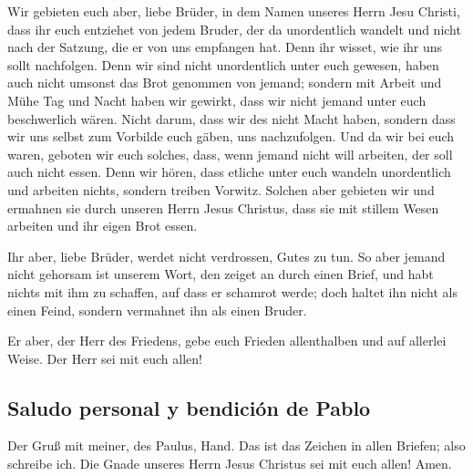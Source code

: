  Wir gebieten euch aber, liebe Brüder, in dem Namen
unseres Herrn Jesu Christi, dass ihr euch entziehet von jedem Bruder,
der da unordentlich wandelt und nicht nach der Satzung, die er von uns
empfangen hat.  Denn ihr wisset, wie ihr uns sollt
nachfolgen. Denn wir sind nicht unordentlich unter euch gewesen,
 haben auch nicht umsonst das Brot genommen von jemand;
sondern mit Arbeit und Mühe Tag und Nacht haben wir gewirkt, dass wir
nicht jemand unter euch beschwerlich wären.  Nicht darum,
dass wir des nicht Macht haben, sondern dass wir uns selbst zum Vorbilde
euch gäben, uns nachzufolgen.  Und da wir bei euch waren,
geboten wir euch solches, dass, wenn jemand nicht will arbeiten, der
soll auch nicht essen.  Denn wir hören, dass etliche
unter euch wandeln unordentlich und arbeiten nichts, sondern treiben
Vorwitz.  Solchen aber gebieten wir und ermahnen sie
durch unseren Herrn Jesus Christus, dass sie mit stillem Wesen arbeiten
und ihr eigen Brot essen.

 Ihr aber, liebe Brüder, werdet nicht verdrossen, Gutes
zu tun.  So aber jemand nicht gehorsam ist unserem Wort,
den zeiget an durch einen Brief, und habt nichts mit ihm zu schaffen,
auf dass er schamrot werde;  doch haltet ihn nicht als
einen Feind, sondern vermahnet ihn als einen Bruder.

 Er aber, der Herr des Friedens, gebe euch Frieden
allenthalben und auf allerlei Weise. Der Herr sei mit euch allen!

\hypertarget{saludo-personal-y-bendiciuxf3n-de-pablo}{%
\subsection{Saludo personal y bendición de
Pablo}\label{saludo-personal-y-bendiciuxf3n-de-pablo}}

 Der Gruß mit meiner, des Paulus, Hand. Das ist das
Zeichen in allen Briefen; also schreibe ich.  Die Gnade
unseres Herrn Jesus Christus sei mit euch allen! Amen.
